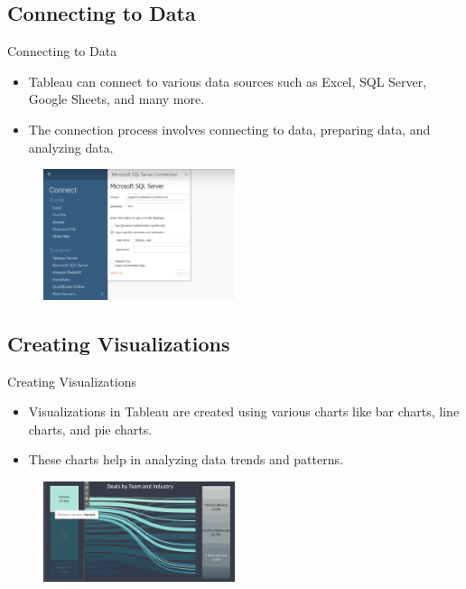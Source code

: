 \documentclass[aspectratio=169, hideothersubsections]{beamer}
\begin{document}
\subsection{Connecting to Data}
\begin{frame}{Connecting to Data}
  \begin{itemize}
    \item Tableau can connect to various data sources such as Excel, SQL Server, Google Sheets, and many more.
    \item The connection process involves connecting to data, preparing data, and analyzing data.
  \end{itemize}
 \begin{figure}
  \centering
  \includegraphics[width=0.5\textwidth]{tab3.png}
  \label{fig:example}
\end{figure}
\end{frame}

\subsection{Creating Visualizations}
\begin{frame}{Creating Visualizations}
  \begin{itemize}
    \item Visualizations in Tableau are created using various charts like bar charts, line charts, and pie charts.
    \item These charts help in analyzing data trends and patterns.
  \end{itemize}
 \begin{figure}
  \centering
  \includegraphics[width=0.5\textwidth]{tab4.png}
  \label{fig:example}
\end{figure}
\end{frame}
\end{document}
